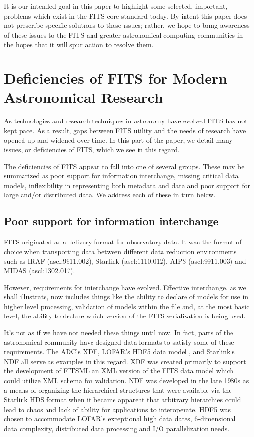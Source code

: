 \documentclass[final,authoryear,5p,times,twocolumn]{elsarticle}
\begin{document}
It is our intended goal in this paper to highlight some selected,
important, problems which exist in the FITS core standard today.
By intent this paper does not prescribe specific solutions to these issues;
rather, we hope to bring awareness of these issues to the FITS and greater
astronomical computing communities in the hopes that
it will spur action to resolve them.

\section{Deficiencies of FITS for Modern Astronomical Research}


As technologies and research techniques in astronomy have evolved FITS
has not kept pace. As a result, gaps between FITS utility and the
needs of research have opened up and widened over time. In this part
of the paper, we detail many issues, or deficiencies of FITS, which we
see in this regard.


The deficiencies of FITS appear to fall into one of several
groups. These may be summarized as poor support for information
interchange, missing critical data models, inflexibility in
representing both metadata and data and poor support for large and/or
distributed data. We address each of these in turn below.

\subsection{Poor support for information interchange}

FITS originated as a delivery format for observatory data. It was the
format of choice when transporting data between different data
reduction environments such as IRAF (ascl:9911.002), Starlink
(ascl:1110.012), AIPS (ascl:9911.003) and MIDAS (ascl:1302.017).


However, requirements for interchange have evolved. Effective
interchange, as we shall illustrate, now includes things like the
ability to declare of models for use in higher level processing,
validation of models within the file and, at the most basic level, the
ability to declare which version of the FITS serialization is being
used.


It's not as if we have not needed these things until now. In fact,
parts of the astronomical community have designed data formats to
satisfy some of these requirements. The ADC's XDF, LOFAR's HDF5 data
model \citep{2012ASPC..461..283A}, and Starlink's NDF
\citep{1988STARB...2...11C,1993ASPC...52..229W,P91_adassxxiii} all
serve as examples in this regard. XDF was created primarily to support
the development of FITSML an XML version of the FITS data model which
could utilize XML schema for validation. NDF was developed in the late
1980s as a means of organizing the hierarchical structures that were
available via the Starlink HDS format when it became apparent that
arbitrary hierarchies could lead to chaos and lack of ability for
applications to interoperate.  HDF5 was chosen to accommodate
LOFAR's exceptional high data dates, 6-dimensional data complexity,
distributed data processing and I/O parallelization needs.
\end{document}
